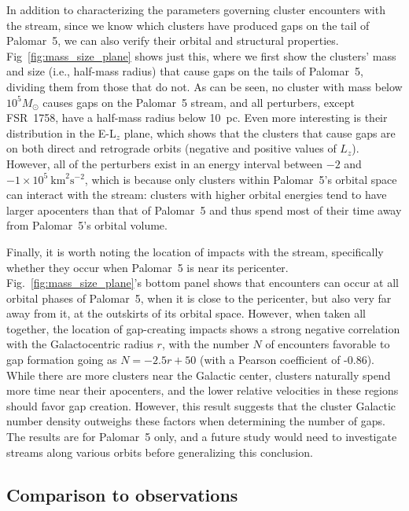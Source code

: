         In addition to characterizing the parameters governing cluster encounters with the stream, since we know which clusters have produced gaps on the tail of Palomar~5, we can also verify their orbital and structural properties. Fig~\ref{fig:mass_size_plane} shows just this, where we first show the clusters' mass and size (i.e., half-mass radius) that cause gaps on the tails of Palomar~5, dividing them from those that do not. As can be seen, no cluster with mass below $10^5 M_\odot$ causes gaps on the Palomar~5 stream, and all perturbers, except FSR~1758, have a half-mass radius below 10~pc. Even more interesting is their distribution in the E-L$_z$ plane, which shows that the clusters that cause gaps are on both direct and retrograde orbits (negative and positive values of $L_z$). However, all of the perturbers exist in an energy interval between $-2$ and $-1 \times10^5~\mathrm{km}^2\mathrm{s}^{-2}$, which is because only clusters within Palomar~5's orbital space can interact with the stream: clusters with higher orbital energies tend to have larger apocenters than that of Palomar~5 and thus spend most of their time away from Palomar~5's orbital volume. 
    
        Finally, it is worth noting the location of impacts with the stream, specifically whether they occur when Palomar~5 is near its pericenter. Fig.~\ref{fig:mass_size_plane}'s bottom panel shows that encounters can occur at all orbital phases of Palomar~5, when it is close to the pericenter, but also very far away from it, at the outskirts of its orbital space. However, when taken all together, the location of gap-creating impacts shows a strong negative correlation with the Galactocentric radius $r$, with the number $N$ of encounters favorable to gap formation going as $N = -2.5r + 50$ (with a Pearson coefficient of -0.86). While there are more clusters near the Galactic center, clusters naturally spend more time near their apocenters, and the lower relative velocities in these regions should favor gap creation. However, this result suggests that the cluster Galactic number density outweighs these factors when determining the number of gaps. The results are for Palomar~5 only, and a future study would need to investigate streams along various orbits before generalizing this conclusion.

    \subsection{Comparison to observations}

